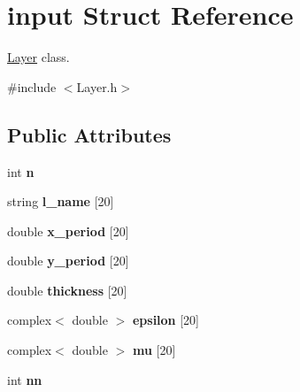 \hypertarget{structinput}{}\section{input Struct Reference}
\label{structinput}


\hyperlink{class_layer}{Layer} class.  




{\ttfamily \#include $<$Layer.\+h$>$}

\subsection*{Public Attributes}
\begin{DoxyCompactItemize}
\item 
int {\bfseries n}\hypertarget{structinput_a763546274a049f79ee864b4cff571a83}{}\label{structinput_a763546274a049f79ee864b4cff571a83}

\item 
string {\bfseries l\+\_\+name} \mbox{[}20\mbox{]}\hypertarget{structinput_a5231fc6d3a583881104db8813a142136}{}\label{structinput_a5231fc6d3a583881104db8813a142136}

\item 
double {\bfseries x\+\_\+period} \mbox{[}20\mbox{]}\hypertarget{structinput_a713f7683ec28c6401bf1546502db2f51}{}\label{structinput_a713f7683ec28c6401bf1546502db2f51}

\item 
double {\bfseries y\+\_\+period} \mbox{[}20\mbox{]}\hypertarget{structinput_a7c070a566d15c81f6e0f369b29bc25ff}{}\label{structinput_a7c070a566d15c81f6e0f369b29bc25ff}

\item 
double {\bfseries thickness} \mbox{[}20\mbox{]}\hypertarget{structinput_a5815ee9753af6c6b8a8d3ace8f5e0693}{}\label{structinput_a5815ee9753af6c6b8a8d3ace8f5e0693}

\item 
complex$<$ double $>$ {\bfseries epsilon} \mbox{[}20\mbox{]}\hypertarget{structinput_a82fc44b9051bd2fd4f30e96e5364865a}{}\label{structinput_a82fc44b9051bd2fd4f30e96e5364865a}

\item 
complex$<$ double $>$ {\bfseries mu} \mbox{[}20\mbox{]}\hypertarget{structinput_aa629c89ce11d190a60b6c4360709de85}{}\label{structinput_aa629c89ce11d190a60b6c4360709de85}

\item 
int {\bfseries nn}\hypertarget{structinput_a09160c6be13ebe926adc063e9e37490d}{}\label{structinput_a09160c6be13ebe926adc063e9e37490d}

\end{DoxyCompactItemize}


